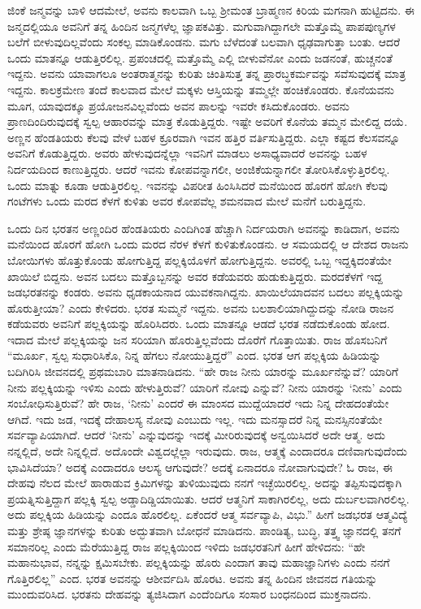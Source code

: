 ಜಿಂಕೆ ಜನ್ಮವನ್ನು ಬಾಳಿ ಆದಮೇಲೆ, ಅವನು ಕಾಲವಾಗಿ ಒಬ್ಬ ಶ‍್ರೀಮಂತ ಬ್ರಾಹ್ಮಣನ ಕಿರಿಯ ಮಗನಾಗಿ ಹುಟ್ಟಿದನು. ಈ ಜನ್ಮದಲ್ಲಿಯೂ ಅವನಿಗೆ ತನ್ನ ಹಿಂದಿನ ಜನ್ಮಗಳೆಲ್ಲ ಜ್ಞಾಪಕವಿತ್ತು. ಮಗುವಾಗಿದ್ದಾಗಲೇ ಮತ್ತೊಮ್ಮೆ ಪಾಪಪುಣ್ಯಗಳ ಬಲೆಗೆ ಬೀಳುವುದಿಲ್ಲವೆಂದು ಸಂಕಲ್ಪ ಮಾಡಿಕೊಂಡನು. ಮಗು ಬೆಳೆದಂತೆ ಬಲವಾಗಿ ಧೃಢವಾಗುತ್ತಾ ಬಂತು. ಆದರೆ ಒಂದು ಮಾತನ್ನೂ ಆಡುತ್ತಿರಲಿಲ್ಲ. ಪ್ರಪಂಚದಲ್ಲಿ ಮತ್ತೊಮ್ಮೆ ಎಲ್ಲಿ ಬೀಳುವೆನೋ ಎಂದು ಜಡನಂತೆ, ಹುಚ್ಚನಂತೆ ಇದ್ದನು. ಅವನು ಯಾವಾಗಲೂ ಅಂತರಾತ್ಮನನ್ನು ಕುರಿತು ಚಿಂತಿಸುತ್ತ ತನ್ನ ಪ್ರಾರಬ್ಧಕರ್ಮವನ್ನು ಸವೆಸುವುದಕ್ಕೆ ಮಾತ್ರ ಇದ್ದನು. ಕಾಲಕ್ರಮೇಣ ತಂದೆ ಕಾಲವಾದ ಮೇಲೆ ಮಕ್ಕಳು ಆಸ್ತಿಯನ್ನು ತಮ್ಮಲ್ಲೇ ಹಂಚಿಕೊಂಡರು. ಕೊನೆಯವನು ಮೂಗ, ಯಾವುದಕ್ಕೂ ಪ್ರಯೋಜನವಿಲ್ಲವೆಂದು ಅವನ ಪಾಲನ್ನು ಇವರೇ ಕಸಿದುಕೊಂಡರು. ಅವನು ಪ್ರಾಣದಿಂದಿರುವುದಕ್ಕೆ ಸ್ವಲ್ಪ ಆಹಾರವನ್ನು ಮಾತ್ರ ಕೊಡುತ್ತಿದ್ದರು. ಇಷ್ಟೇ ಅವರಿಗೆ ಕೊನೆಯ ತಮ್ಮನ ಮೇಲಿದ್ದ ದಯೆ. ಅಣ್ಣನ ಹೆಂಡತಿಯರು ಕೆಲವು ವೇಳೆ ಬಹಳ ಕ್ರೂರವಾಗಿ ಇವನ ಹತ್ತಿರ ವರ್ತಿಸುತ್ತಿದ್ದರು. ಎಲ್ಲಾ ಕಷ್ಟದ ಕೆಲಸವನ್ನೂ ಅವನಿಗೆ ಕೊಡುತ್ತಿದ್ದರು. ಅವರು ಹೇಳುವುದನ್ನೆಲ್ಲಾ ಇವನಿಗೆ ಮಾಡಲು ಅಸಾಧ್ಯವಾದರೆ ಅವನನ್ನು ಬಹಳ ನಿರ್ದಯದಿಂದ ಕಾಣುತ್ತಿದ್ದರು. ಆದರೆ ಇವನು ಕೋಪವನ್ನಾಗಲೀ, ಅಂಜಿಕೆಯನ್ನಾಗಲೀ ತೋರಿಸಿಕೊಳ್ಳುತ್ತಿರಲಿಲ್ಲ. ಒಂದು ಮಾತ್ನು ಕೂಡಾ ಆಡುತ್ತಿರಲಿಲ್ಲ. ಇವನನ್ನು ವಿಪರೀತ ಹಿಂಸಿಸಿದರೆ ಮನೆಯಿಂದ ಹೊರಗೆ ಹೋಗಿ ಕೆಲವು ಗಂಟೆಗಳು ಒಂದು ಮರದ ಕೆಳಗೆ ಕುಳಿತು ಅವರ ಕೋಪವೆಲ್ಲ ಶಮನವಾದ ಮೇಲೆ ಮನೆಗೆ ಬರುತ್ತಿದ್ದನು.

ಒಂದು ದಿನ ಭರತನ ಅಣ್ಣಂದಿರ ಹೆಂಡತಿಯರು ಎಂದಿಗಿಂತ ಹೆಚ್ಚಾಗಿ ನಿರ್ದಯರಾಗಿ ಅವನನ್ನು ಕಾಡಿದಾಗ, ಅವನು ಮನೆಯಿಂದ ಹೊರಗೆ ಹೋಗಿ ಒಂದು ಮರದ ನೆರಳ ಕೆಳಗೆ ಕುಳಿತುಕೊಂಡನು. ಆ ಸಮಯದಲ್ಲಿ ಆ ದೇಶದ ರಾಜನು ಬೋಯಿಗಳು ಹೊತ್ತುಕೊಂಡು ಹೋಗುತ್ತಿದ್ದ ಪಲ್ಲಕ್ಕಿಯೊಳಗೆ ಹೋಗುತ್ತಿದ್ದನು. ಅವರಲ್ಲಿ ಒಬ್ಬ ಇದ್ದಕ್ಕಿದಂತೆಯೇ ಖಾಯಿಲೆ ಬಿದ್ದನು. ಅವನ ಬದಲು ಮತ್ತೊಬ್ಬನನ್ನು ಅವರ ಕಡೆಯವರು ಹುಡುಕುತ್ತಿದ್ದರು. ಮರದಕೆಳಗೆ ಇದ್ದ ಜಡಭರತನನ್ನು ಕಂಡರು. ಅವನು ಧೃಡಕಾಯನಾದ ಯುವಕನಾಗಿದ್ದನು. ಖಾಯಿಲೆಯಾದವನ ಬದಲು ಪಲ್ಲಕ್ಕಿಯನ್ನು ಹೊರುತ್ತೀಯಾ? ಎಂದು ಕೇಳಿದರು. ಭರತ ಸುಮ್ಮನೆ ಇದ್ದನು. ಅವನು ಬಲಶಾಲಿಯಾಗಿದ್ದುದನ್ನು ನೋಡಿ ರಾಜನ ಕಡೆಯವರು ಅವನಿಗೆ ಪಲ್ಲಕ್ಕಿಯನ್ನು ಹೊರಿಸಿದರು. ಒಂದು ಮಾತನ್ನೂ ಆಡದೆ ಭರತ ನಡೆದುಕೊಂಡು ಹೋದ. ಇದಾದ ಮೇಲೆ ಪಲ್ಲಕ್ಕಿಯನ್ನು ಜನ ಸರಿಯಾಗಿ ಹೊರುತ್ತಿಲ್ಲವೆಂದು ದೊರೆಗೆ ಗೊತ್ತಾಯಿತು. ರಾಜ ಹೊಸಬನಿಗೆ “ಮೂರ್ಖ, ಸ್ವಲ್ಪ ಸುಧಾರಿಸಿಕೊ, ನಿನ್ನ ಹೆಗಲು ನೋಯುತ್ತಿದ್ದರೆ” ಎಂದ. ಭರತ ಆಗ ಪಲ್ಲಕ್ಕಿಯ ಹಿಡಿಯನ್ನು ಬದಿಗಿರಿಸಿ ಜೀವನದಲ್ಲಿ ಪ್ರಥಮಬಾರಿ ಮಾತನಾಡಿದನು. “ಹೇ ರಾಜ ನೀನು ಯಾರನ್ನು ಮೂರ್ಖನೆನ್ನುವೆ? ಯಾರಿಗೆ ನೀನು ಪಲ್ಲಕ್ಕಿಯನ್ನು ಇಳಿಸು ಎಂದು ಹೇಳುತ್ತಿರುವೆ? ಯಾರಿಗೆ ನೋವು ಎನ್ನುವೆ? ನೀನು ಯಾರನ್ನು ‘ನೀನು’ ಎಂದು ಸಂಬೋಧಿಸುತ್ತಿರುವೆ? ಹೇ ರಾಜ, ‘ನೀನು’ ಎಂದರೆ ಈ ಮಾಂಸದ ಮುದ್ದೆಯಾದರೆ ಇದು ನಿನ್ನ ದೇಹದಂತೆಯೇ ಆಗಿದೆ. ಇದು ಜಡ, ಇದಕ್ಕೆ ದೇಹಾಲಸ್ಯ ನೋವು ಎಂಬುದು ಇಲ್ಲ. ಇದು ಮನಸ್ಸಾದರೆ ನಿನ್ನ ಮನಸ್ಸಿನಂತೆಯೇ ಸರ್ವವ್ಯಾಪಿಯಾಗಿದೆ. ಆದರೆ ‘ನೀನು’ ಎನ್ನುವುದನ್ನು ಇದಕ್ಕೆ ಮೀರಿರುವುದಕ್ಕೆ ಅನ್ವಯಿಸಿದರೆ ಅದೇ ಆತ್ಮ. ಅದು ನನ್ನಲ್ಲಿದೆ, ಅದೇ ನಿನ್ನಲ್ಲಿದೆ. ಅದೊಂದೇ ವಿಶ್ವದಲ್ಲೆಲ್ಲಾ ಇರುವುದು. ರಾಜ, ಆತ್ಮಕ್ಕೆ ಎಂದಾದರೂ ದಣಿವಾಗುವುದೆಂದು ಭಾವಿಸಿದೆಯಾ? ಅದಕ್ಕೆ ಎಂದಾದರೂ ಆಲಸ್ಯ ಆಗುವುದೇ? ಅದಕ್ಕೆ ಏನಾದರೂ ನೋವಾಗುವುದೇ? ಓ ರಾಜ, ಈ ದೇಹವು ನೆಲದ ಮೇಲೆ ಹಾರಾಡುವ ಕ್ರಿಮಿಗಳನ್ನು ತುಳಿಯುವುದು ನನಗೆ ಇಚ್ಛೆಯಿರಲಿಲ್ಲ. ಅದನ್ನು ತಪ್ಪಿಸುವುದಕ್ಕಾಗಿ ಪ್ರಯತ್ನಿಸುತ್ತಿದ್ದಾಗ ಪಲ್ಲಕ್ಕಿ ಸ್ವಲ್ಪ ಅಡ್ಡಾದಿಡ್ಡಿಯಾಯಿತು. ಆದರೆ ಆತ್ಮನಿಗೆ ಸಾಕಾಗಿರಲಿಲ್ಲ, ಅದು ದುರ್ಬಲವಾಗಿರಲಿಲ್ಲ. ಅದು ಪಲ್ಲಕ್ಕಿಯ ಹಿಡಿಯನ್ನು ಎಂದೂ ಹೊರಲಿಲ್ಲ. ಏಕೆಂದರೆ ಆತ್ಮ ಸರ್ವವ್ಯಾಪಿ, ವಿಭು.” ಹೀಗೆ ಜಡಭರತ ಆತ್ಮವಿದ್ಯೆ ಮತ್ತು ಶ್ರೇಷ್ಠ ಜ್ಞಾನಗಳನ್ನು ಕುರಿತು ಅದ್ಭುತವಾಗಿ ಬೋಧನೆ ಮಾಡಿದನು. ಪಾಂಡಿತ್ಯ, ಬುದ್ಧಿ, ತತ್ತ್ವ ಜ್ಞಾನದಲ್ಲಿ ತನಗೆ ಸಮಾನರಿಲ್ಲ ಎಂದು ಮೆರೆಯುತ್ತಿದ್ದ ರಾಜ ಪಲ್ಲಕ್ಕಿಯಿಂದ ಇಳಿದು ಜಡಭರತನಿಗೆ ಹೀಗೆ ಹೇಳಿದನು: “ಹೇ ಮಹಾನುಭಾವ, ನನ್ನನ್ನು ಕ್ಷಮಿಸಬೇಕು. ಪಲ್ಲಕ್ಕಿಯನ್ನು ಹೊರು ಎಂದಾಗ ತಾವು ಮಹಾಜ್ಞಾನಿಗಳು ಎಂದು ನನಗೆ ಗೊತ್ತಿರಲಿಲ್ಲ” ಎಂದ. ಭರತ ಅವನನ್ನು ಆಶೀರ್ವದಿಸಿ ಹೊರಟ. ಅವನು ತನ್ನ ಹಿಂದಿನ ಜೀವನದ ಗತಿಯನ್ನು ಮುಂದುವರಿಸಿದ. ಭರತನು ದೇಹವನ್ನು ತ್ಯಜಿಸಿದಾಗ ಎಂದೆಂದಿಗೂ ಸಂಸಾರ ಬಂಧನದಿಂದ ಮುಕ್ತನಾದನು.

